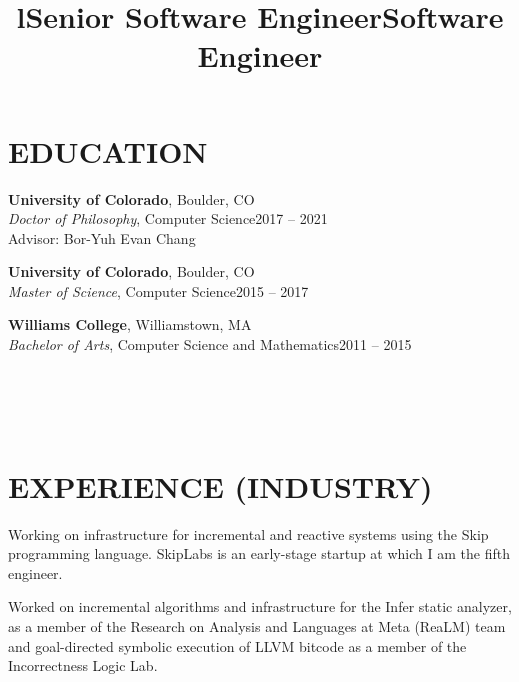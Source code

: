 \documentclass[margin,10pt]{res}
\begin{document}
\begin{resume}

\section{EDUCATION}
\textbf{University of Colorado}, Boulder, CO\\
{\sl Doctor of Philosophy}, Computer Science\hfill 2017 -- 2021\\
Advisor: Bor-Yuh Evan Chang

\textbf{University of Colorado}, Boulder, CO\\
{\sl Master of Science}, Computer Science\hfill 2015 -- 2017

\textbf{Williams College}, Williamstown, MA\\
{\sl Bachelor of Arts}, Computer Science and Mathematics\hfill 2011 -- 2015


\begin{format}
\title{l}\\
\\
\body\\
\end{format}

\section{EXPERIENCE (INDUSTRY)}
\title{\textbf{Senior Software Engineer}}
\begin{position}
Working on infrastructure for incremental and reactive systems using the Skip programming language.  SkipLabs is an early-stage startup at which I am the fifth engineer.
\end{position}
\title{\textbf{Software Engineer}}
\begin{position}
Worked on incremental algorithms and infrastructure for the Infer static analyzer, as a member of the Research on Analysis and Languages at Meta (ReaLM) team and goal-directed symbolic execution of LLVM bitcode as a member of the Incorrectness Logic Lab.
\end{position}


\end{resume}
\end{document}
